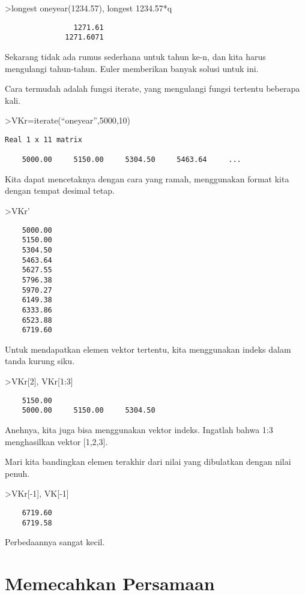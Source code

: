 \documentclass[
]{book}
\begin{document}
\textgreater longest oneyear(1234.57), longest 1234.57*q

\begin{verbatim}
                1271.61 
              1271.6071 
\end{verbatim}

Sekarang tidak ada rumus sederhana untuk tahun ke-n, dan kita harus mengulangi tahun-tahun. Euler memberikan banyak solusi untuk ini.

Cara termudah adalah fungsi iterate, yang mengulangi fungsi tertentu beberapa kali.

\textgreater VKr=iterate(``oneyear'',5000,10)

\begin{verbatim}
Real 1 x 11 matrix

    5000.00     5150.00     5304.50     5463.64     ...
\end{verbatim}

Kita dapat mencetaknya dengan cara yang ramah, menggunakan format kita dengan tempat desimal tetap.

\textgreater VKr'

\begin{verbatim}
    5000.00 
    5150.00 
    5304.50 
    5463.64 
    5627.55 
    5796.38 
    5970.27 
    6149.38 
    6333.86 
    6523.88 
    6719.60 
\end{verbatim}

Untuk mendapatkan elemen vektor tertentu, kita menggunakan indeks dalam tanda kurung siku.

\textgreater VKr{[}2{]}, VKr{[}1:3{]}

\begin{verbatim}
    5150.00 
    5000.00     5150.00     5304.50 
\end{verbatim}

Anehnya, kita juga bisa menggunakan vektor indeks. Ingatlah bahwa 1:3 menghasilkan vektor {[}1,2,3{]}.

Mari kita bandingkan elemen terakhir dari nilai yang dibulatkan dengan nilai penuh.

\textgreater VKr{[}-1{]}, VK{[}-1{]}

\begin{verbatim}
    6719.60 
    6719.58 
\end{verbatim}

Perbedaannya sangat kecil.

\chapter{Memecahkan Persamaan}\label{memecahkan-persamaan}
\end{document}
